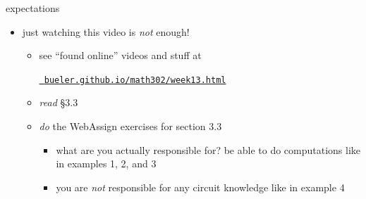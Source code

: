\documentclass[urlcolor=blue,dvipsnames]{beamer}
\begin{document}
\begin{frame}{expectations}

\begin{itemize}
\item just watching this video is \emph{not} enough!
     \begin{itemize}
     \item see ``found online'' videos and stuff at

     \centerline{\href{https://bueler.github.io/math302/week13.html}{\tt \color{cyan} bueler.github.io/math302/week13.html}}
     \item \emph{read} \S3.3
     \item \emph{do} the WebAssign exercises for section 3.3
         \begin{itemize}
         \item what are you actually responsible for?  be able to do computations like in examples 1, 2, and 3
         \item you are \emph{not} responsible for any circuit knowledge like in example 4
         \end{itemize}
     \end{itemize}
\end{itemize}
\end{frame}
\end{document}
